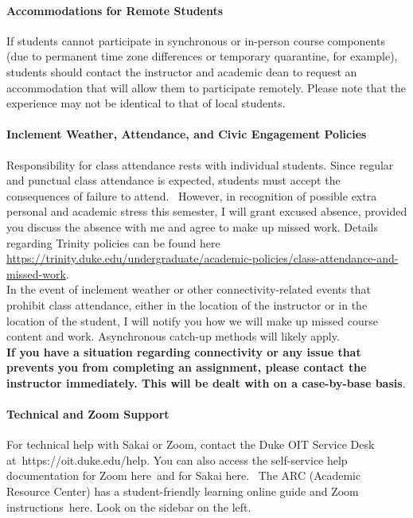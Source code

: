 \documentclass[11pt]{article}
\begin{document}
\paragraph{Accommodations for Remote Students}
If students cannot participate in synchronous or in-person course components (due to permanent time zone differences or temporary quarantine, for example), students should contact the instructor and academic dean to request an accommodation that will allow them to participate remotely. Please note that the experience may not be identical to that of local students.\\

\paragraph{Inclement Weather, Attendance, and Civic Engagement Policies}
Responsibility for class attendance rests with individual students. Since regular and punctual class attendance is expected, students must accept the consequences of failure to attend.  However, in recognition of possible extra personal and academic stress this semester, I will grant excused absence, provided you discuss the absence with me and agree to make up missed work. Details regarding Trinity policies can be found here \url{https://trinity.duke.edu/undergraduate/academic-policies/class-attendance-and-missed-work}. \\

In the event of inclement weather or other connectivity-related events that prohibit class attendance, either in the location of the instructor or in the location of the student, I will notify you how we will make up missed course content and work.  Asynchronous catch-up methods will likely apply.\\

\textbf{If you have a situation regarding connectivity or any issue that prevents you from completing an assignment, please contact the instructor immediately. This will be dealt with on a case-by-base basis}. \\



\paragraph{Technical and Zoom Support}
For technical help with Sakai or Zoom, contact the Duke OIT Service Desk at https://oit.duke.edu/help. You can also access the self-service help documentation for Zoom here and for Sakai here.  The ARC (Academic Resource Center) has a student-friendly learning online guide and Zoom instructions here. Look on the sidebar on the left.\\
\end{document}
